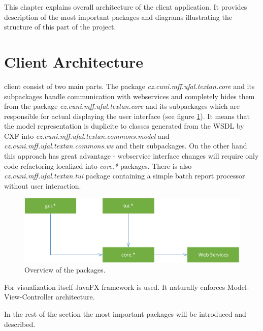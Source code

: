 
This chapter explains overall architecture of the \textan{} client application.
It provides description of the most important packages and diagrams illustrating
the structure of this part of the project.

\section{Client Architecture}



\textan{} client consist of two main parts. The package
\emph{cz.cuni.mff.ufal.textan.core} and its subpackages handle communication
with webservices and completely hides them from the package
\emph{cz.cuni.mff.ufal.textan.core} and its subpackages which are responsible
for actual displaying the user interface (see figure \ref{fig:ClientOverview}).
It means that the model representation is duplicite to classes generated from
the WSDL by CXF into \emph{cz.\-cuni.\-mff.\-ufal.\-textan.\-commons.\-model}
and \emph{cz.\-cuni.\-mff.\-ufal.\-textan.\-commons.\-ws} and their subpackages.
On the other hand this approach has great advantage - webservice interface
changes will require only code refactoring localized into \emph{core.*}
packages. There is also \emph{cz.\-cuni.\-mff.\-ufal.\-textan.\-tui} package
containing a simple batch report processor without user interaction.

\begin{figure}[!htb]
        \centering
        \includegraphics[width=\textwidth]{Images/ClientOverview}
        \caption{Overview of the packages.}
        \label{fig:ClientOverview}
\end{figure}

For visualization itself JavaFX framework is used. It naturally enforces
Model-View-Controller architecture.

In the rest of the section the most important packages will be introduced and
described.

